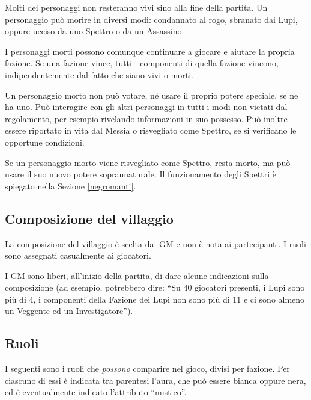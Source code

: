 \documentclass[a4paper,10pt]{article}
\begin{document}
Molti dei personaggi non resteranno vivi sino alla fine della partita. Un personaggio può morire in diversi modi: condannato al rogo, sbranato dai Lupi, oppure ucciso da uno Spettro o da un Assassino.

I personaggi morti possono comunque continuare a giocare e aiutare la propria fazione. Se una fazione vince, tutti i componenti di quella fazione vincono, indipendentemente dal fatto che siano vivi o morti.

Un personaggio morto non può votare, né usare il proprio potere speciale, se ne ha uno. Può interagire con gli altri personaggi in tutti i modi non vietati dal regolamento, per esempio rivelando informazioni in suo possesso. Può inoltre essere riportato in vita dal Messia o risvegliato come Spettro, se si verificano le opportune condizioni.

Se un personaggio morto viene risvegliato come Spettro, resta morto, ma può usare il suo nuovo potere soprannaturale. Il funzionamento degli Spettri è spiegato nella Sezione \ref{negromanti}.


\subsection{Composizione del villaggio}
 
La composizione del villaggio è scelta dai GM e non è nota ai partecipanti. I ruoli sono assegnati casualmente ai giocatori.

I GM sono liberi, all'inizio della partita, di dare alcune indicazioni sulla composizione (ad esempio, potrebbero dire: ``Su $40$ giocatori presenti, i Lupi sono più di $4$, i componenti della Fazione dei Lupi non sono più di $11$ e ci sono almeno un Veggente ed un Investigatore'').


\subsection{Ruoli}
\label{ruoli}


I seguenti sono i ruoli che \emph{possono} comparire nel gioco, divisi per fazione. Per ciascuno di essi è indicata tra parentesi l'aura, che può essere bianca oppure nera, ed è eventualmente indicato l'attributo ``mistico''.
\end{document}
